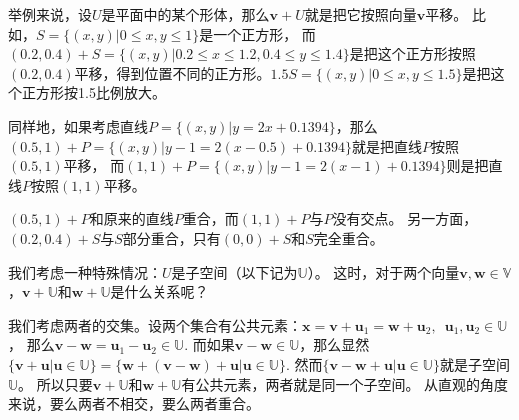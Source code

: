 \documentclass[12pt,UTF8]{ctexbook}
\begin{document}
举例来说，设$U$是平面中的某个形体，那么$\mathbf{v} + U$就是把它按照向量$\mathbf{v}$平移。
比如，$S = \{(x,y) | 0 \leqslant x, y \leqslant 1\}$是一个正方形，
而$(0.2, 0.4) + S = \{(x,y) | 0.2 \leqslant x \leqslant 1.2, 0.4 \leqslant y \leqslant 1.4\}$是把这个正方形按照$(0.2, 0.4)$平移，得到位置不同的正方形。$1.5 S = \{(x,y) | 0 \leqslant x, y \leqslant 1.5\}$是把这个正方形按1.5比例放大。

同样地，如果考虑直线$P = \{(x,y) | y = 2 x + 0.1394\}$，那么$(0.5, 1) + P = \{(x,y) | y - 1 = 2 (x - 0.5) + 0.1394\}$就是把直线$P$按照$(0.5, 1)$平移，
而$(1, 1) + P = \{(x,y) | y - 1 = 2 (x - 1) + 0.1394\}$则是把直线$P$按照$(1, 1)$平移。

$(0.5, 1) + P$和原来的直线$P$重合，而$(1, 1) + P$与$P$没有交点。
另一方面，$(0.2, 0.4) + S$与$S$部分重合，只有$(0, 0) + S$和$S$完全重合。

我们考虑一种特殊情况：$U$是子空间（以下记为$\mathbb{U}$）。
这时，对于两个向量$\mathbf{v}, \mathbf{w} \in \mathbb{V}$，$\mathbf{v} + \mathbb{U}$和$\mathbf{w} + \mathbb{U}$是什么关系呢？

我们考虑两者的交集。设两个集合有公共元素：$\mathbf{x} = \mathbf{v} + \mathbf{u}_1 = \mathbf{w} + \mathbf{u}_2, \,\,\, \mathbf{u}_1, \mathbf{u}_2 \in \mathbb{U}$，
那么$\mathbf{v} - \mathbf{w} = \mathbf{u}_1 - \mathbf{u}_2 \in \mathbb{U}$. 
而如果$\mathbf{v} - \mathbf{w} \in \mathbb{U}$，那么显然$\{\mathbf{v} + \mathbf{u} | \mathbf{u} \in \mathbb{U}\} = \{\mathbf{w} +  (\mathbf{v} - \mathbf{w}) + \mathbf{u} | \mathbf{u} \in \mathbb{U}\}.$ 
然而$\{\mathbf{v} - \mathbf{w} + \mathbf{u} | \mathbf{u} \in \mathbb{U}\}$就是子空间$\mathbb{U}$。
所以只要$\mathbf{v} + \mathbb{U}$和$\mathbf{w} + \mathbb{U}$有公共元素，两者就是同一个子空间。
从直观的角度来说，要么两者不相交，要么两者重合。
\end{document}
